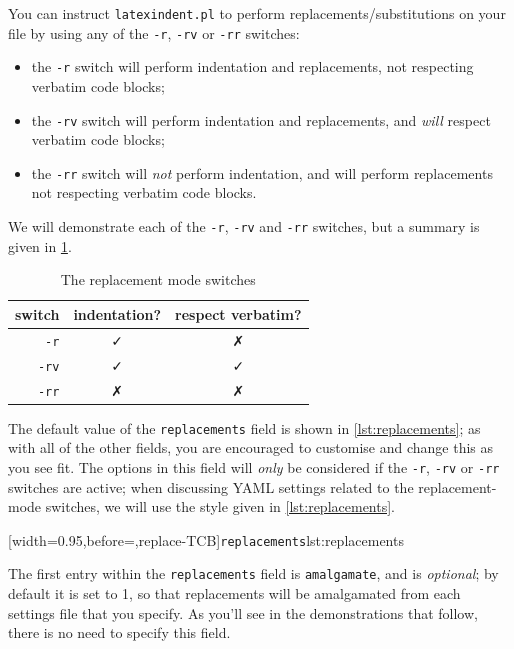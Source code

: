 \documentclass[10pt]{article}
\begin{document}
 You can instruct \texttt{latexindent.pl} to perform replacements/substitutions on your
  file by using any of the \texttt{-r},
 \texttt{-rv} or \texttt{-rr} switches: 
 \begin{itemize}
  \item the \texttt{-r} switch will perform indentation and replacements, not respecting
        verbatim code blocks;
  \item the \texttt{-rv} switch will perform indentation and replacements, and
        \emph{will} respect verbatim code blocks;
  \item the \texttt{-rr} switch will \emph{not} perform indentation, and will perform
        replacements not respecting verbatim code blocks.
 \end{itemize}

 We will demonstrate each of the \texttt{-r}, \texttt{-rv} and \texttt{-rr} switches, but
 a summary is given in \cref{tab:replacementswitches}.

 \begin{table}[!htb]
  \centering
  \caption{The replacement mode switches}\label{tab:replacementswitches}
  \begin{tabular}{rcc}
   \toprule
   switch       & indentation? & respect verbatim? \\
   \midrule
   \texttt{-r}  & \faCheck     & \faClose          \\
   \texttt{-rv} & \faCheck     & \faCheck          \\
   \texttt{-rr} & \faClose     & \faClose          \\
   \bottomrule
  \end{tabular}
 \end{table}

 The default value of the \texttt{replacements} field is shown in
 \cref{lst:replacements}; as with all of the other fields, you are encouraged to
 customise and change this as you see fit. The options in this field will \emph{only} be
 considered if the \texttt{-r}, \texttt{-rv} or \texttt{-rr} switches are active; when
 discussing YAML settings related to the replacement-mode switches, we will use the style
 given in \cref{lst:replacements}.

 [width=0.95\linewidth,before=\centering,replace-TCB]{\texttt{replacements}}{lst:replacements}

 The first entry within the \texttt{replacements} field is \texttt{amalgamate}, and is
 \emph{optional}; by default it is set to 1, so that replacements will be amalgamated
 from each settings file that you specify. As you'll see in the demonstrations that
 follow, there is no need to specify this field.
\end{document}
